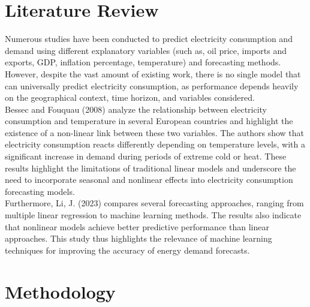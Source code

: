 \documentclass[11pt,a4paper]{article}
\begin{document}
\section{Literature Review}
\label{sec:literature}
Numerous studies have been conducted to predict electricity consumption and demand using different explanatory variables (such as, oil price, imports and exports, GDP, inflation percentage, temperature) and forecasting methods. However, despite the vast amount of existing work, there is no single model that can universally predict electricity consumption, as performance depends heavily on the geographical context, time horizon, and variables considered.\\

Bessec and Fouquau (2008) analyze the relationship between electricity consumption and temperature in several European countries and highlight the existence of a non-linear link between these two variables. The authors show that electricity consumption reacts differently depending on temperature levels, with a significant increase in demand during periods of extreme cold or heat. These results highlight the limitations of traditional linear models and underscore the need to incorporate seasonal and nonlinear effects into electricity consumption forecasting models.\\

Furthermore, Li, J. (2023) compares several forecasting approaches, ranging from multiple linear regression to machine learning methods. The results also indicate that nonlinear models achieve better predictive performance than linear approaches. This study thus highlights the relevance of machine learning techniques for improving the accuracy of energy demand forecasts.

\section{Methodology}
\label{sec:methodology}
\end{document}
